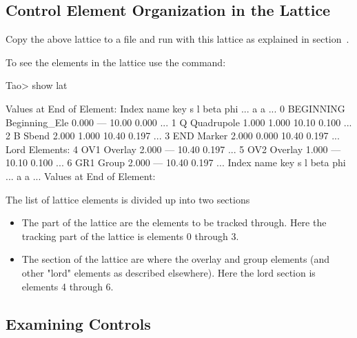 \documentclass{hitec}
\begin{document}
\subsection{Control Element Organization in the Lattice}

Copy the above lattice to a file and run \tao with this lattice as explained in
section~.

To see the elements in the lattice use the  command:
\begin{code}
Tao> show lat

      Values at End of Element:
 Index  name      key                       s       l    beta     phi ...
                                                            a       a ...
     0  BEGINNING Beginning_Ele         0.000     ---   10.00   0.000 ...
     1  Q         Quadrupole            1.000   1.000   10.10   0.100 ...
     2  B         Sbend                 2.000   1.000   10.40   0.197 ...
     3  END       Marker                2.000   0.000   10.40   0.197 ...
Lord Elements:
     4  OV1       Overlay               2.000     ---   10.40   0.197 ...
     5  OV2       Overlay               1.000     ---   10.10   0.100 ...
     6  GR1       Group                 2.000     ---   10.40   0.197 ...
 Index  name      key                       s       l    beta     phi ...
                                                            a       a ...
      Values at End of Element:
\end{code}

The list of lattice elements is divided up into two sections
\begin{itemize}
\item
The  part of the lattice are the elements to be tracked through. Here the tracking part of
the lattice is elements 0 through 3.
\item
The  section of the lattice are where the overlay and group elements (and other "lord"
elements as described elsewhere). Here the lord section is elements 4 through 6.
\end{itemize}

\subsection{Examining Controls}
\end{document}
